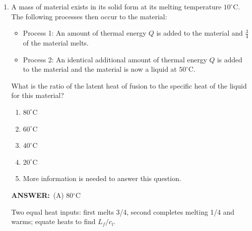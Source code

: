 ﻿\documentclass[12pt, a4paper]{article}
\makeatletter
\newcommand{\finalanswer}[1]{\textbf{ANSWER:}~#1}
\newif\if@categoryprinted
\newcommand{\category}[1]{\if@categoryprinted\relax\else\textit{\textcolor{gray}{Category: #1}}\global\@categoryprintedtrue\fi}
\makeatother
\begin{document}
\begin{CJK*}{UTF8}{gbsn}
\begin{enumerate}[itemsep=1.0em, topsep=0.6em]
\category{Waves \& Sound}
\begin{answerbox}
\finalanswer{(C) 659.6 Hz}
\end{answerbox}
\begin{insightbox}
Closed-tube resonances are spaced by $\lambda/2$; determine $\lambda$ from the difference in lengths and compute $f=v/\lambda$.
\end{insightbox}
\begin{solutionbox}

For a closed tube, successive resonances differ by $\Delta L = \tfrac{\lambda}{2}$. In this case $\Delta L = 0.65\,\text{m} - 0.39\,\text{m} = 0.26\,\text{m}$, so $\lambda = 2\times 0.26 = 0.52\,\text{m}$. The frequency is
\[
 f = \frac{v}{\lambda} = \frac{343\,\text{m/s}}{0.52\,\text{m}} \approx 659.6\,\text{Hz}.
\]
\\
\emph{Model:} closed鈥搊pen tube has harmonics $L=(2n-1)\lambda/4$, so successive $L$ differ by $\lambda/2$.
\end{solutionbox}

\item \label{prob:4}
A mass of material exists in its solid form at its melting temperature $10^\circ$C. The following processes then occur to the material:
\begin{itemize}
    \item Process 1: An amount of thermal energy $Q$ is added to the material and $\tfrac{3}{4}$ of the material melts.
    \item Process 2: An identical additional amount of thermal energy $Q$ is added to the material and the material is now a liquid at $50^\circ$C.
\end{itemize}
What is the ratio of the latent heat of fusion to the specific heat of the liquid for this material?
\begin{enumerate}[label=(\Alph*)]
    \item $80^\circ$C
    \item $60^\circ$C
    \item $40^\circ$C
    \item $20^\circ$C
    \item More information is needed to answer this question.
\end{enumerate}

\category{Thermodynamics \& Phase Change}
\begin{answerbox}
\finalanswer{(A) 80$^{\circ}$C}
\end{answerbox}
\begin{insightbox}
Two equal heat inputs: first melts 3/4, second completes melting 1/4 and warms; equate heats to find $L_f/c_l$.
\end{insightbox}
\begin{solutionbox}


\end{solutionbox}
\end{enumerate}
\end{CJK*}
\end{document}
